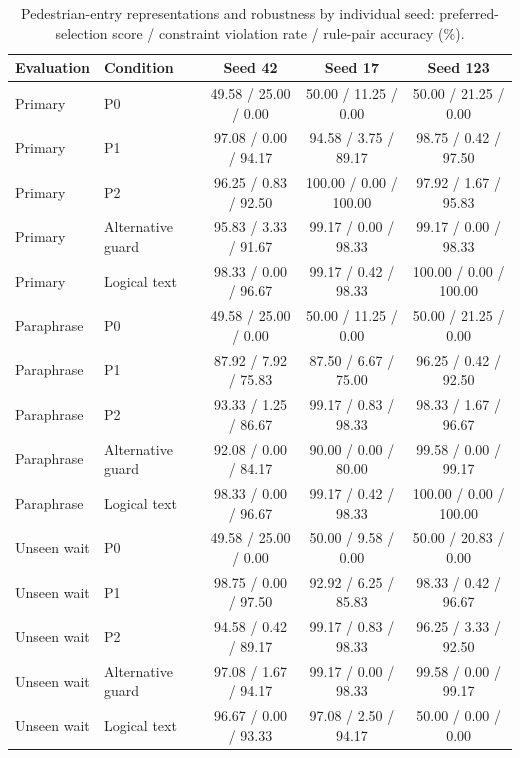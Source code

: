 \documentclass[10pt]{article}
\begin{document}
\begin{table}[tbp]
\centering\footnotesize\setlength{\tabcolsep}{3pt}
\caption{Pedestrian-entry representations and robustness by individual seed: preferred-selection score / constraint violation rate / rule-pair accuracy (\%).}
\label{tab:sup-temporal-robust-seeds}
\begin{tabular}{llccc}
\toprule
Evaluation & Condition & Seed 42 & Seed 17 & Seed 123\\
\midrule
Primary & P0 & 49.58 / 25.00 / 0.00 & 50.00 / 11.25 / 0.00 & 50.00 / 21.25 / 0.00\\
Primary & P1 & 97.08 / 0.00 / 94.17 & 94.58 / 3.75 / 89.17 & 98.75 / 0.42 / 97.50\\
Primary & P2 & 96.25 / 0.83 / 92.50 & 100.00 / 0.00 / 100.00 & 97.92 / 1.67 / 95.83\\
Primary & Alternative guard & 95.83 / 3.33 / 91.67 & 99.17 / 0.00 / 98.33 & 99.17 / 0.00 / 98.33\\
Primary & Logical text & 98.33 / 0.00 / 96.67 & 99.17 / 0.42 / 98.33 & 100.00 / 0.00 / 100.00\\
Paraphrase & P0 & 49.58 / 25.00 / 0.00 & 50.00 / 11.25 / 0.00 & 50.00 / 21.25 / 0.00\\
Paraphrase & P1 & 87.92 / 7.92 / 75.83 & 87.50 / 6.67 / 75.00 & 96.25 / 0.42 / 92.50\\
Paraphrase & P2 & 93.33 / 1.25 / 86.67 & 99.17 / 0.83 / 98.33 & 98.33 / 1.67 / 96.67\\
Paraphrase & Alternative guard & 92.08 / 0.00 / 84.17 & 90.00 / 0.00 / 80.00 & 99.58 / 0.00 / 99.17\\
Paraphrase & Logical text & 98.33 / 0.00 / 96.67 & 99.17 / 0.42 / 98.33 & 100.00 / 0.00 / 100.00\\
Unseen wait & P0 & 49.58 / 25.00 / 0.00 & 50.00 / 9.58 / 0.00 & 50.00 / 20.83 / 0.00\\
Unseen wait & P1 & 98.75 / 0.00 / 97.50 & 92.92 / 6.25 / 85.83 & 98.33 / 0.42 / 96.67\\
Unseen wait & P2 & 94.58 / 0.42 / 89.17 & 99.17 / 0.83 / 98.33 & 96.25 / 3.33 / 92.50\\
Unseen wait & Alternative guard & 97.08 / 1.67 / 94.17 & 99.17 / 0.00 / 98.33 & 99.58 / 0.00 / 99.17\\
Unseen wait & Logical text & 96.67 / 0.00 / 93.33 & 97.08 / 2.50 / 94.17 & 50.00 / 0.00 / 0.00\\
\bottomrule
\end{tabular}
\end{table}
\end{document}
